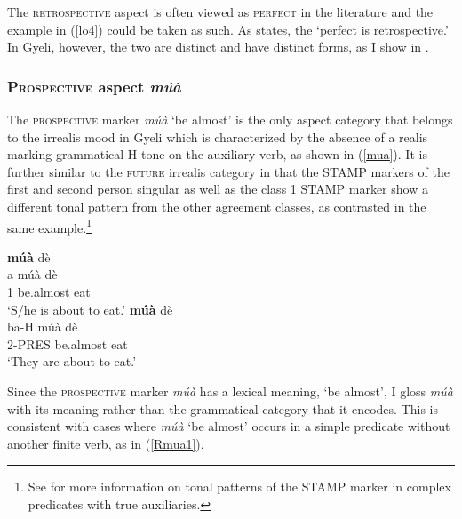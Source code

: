 The \textsc{retrospective} aspect is often viewed as \textsc{perfect} in the literature and the example in (\ref{lo4}) could be taken as such. As \citet[64]{comrie76} states, the `perfect is retrospective.' In Gyeli, however, the two are distinct and have distinct forms, as I show in .











\subsubsection{\textsc{Prospective} aspect {\itshape múà}}
\label{sec:PROSP}

The \textsc{prospective} marker {\itshape múà} `be almost' is the only aspect category that belongs to the irrealis mood in Gyeli which is characterized by the absence of a realis marking grammatical H tone on the auxiliary verb, as shown in (\ref{mua}). It is further similar to the \textsc{future} irrealis category in that the STAMP markers of the first and second person singular as well as the class 1 STAMP marker show a different tonal pattern from the other agreement classes, as contrasted in the same example.\footnote{See  for more information on tonal patterns of the STAMP marker in complex predicates with true auxiliaries.}

\begin{exe}  
\ex\label{mua}
\begin{xlist} 
\ex\label{mua1}
   {\bfseries múà} dè \\
             a múà dè  \\
             1  be.almost eat \\
    \trans `S/he is about to eat.'
\ex\label{mua2}
   {\bfseries múà} dè \\
         ba-H múà dè \\
             2-PRES be.almost eat  \\
    \trans `They are about to eat.'
\end{xlist}
\end{exe}

Since the \textsc{prospective} marker {\itshape múà} has a lexical meaning, `be almost', I gloss {\itshape múà} with its meaning rather than the grammatical category that it encodes. This is consistent with cases where {\itshape múà} `be almost' occurs in a simple predicate without another finite verb, as in (\ref{Rmua1}).

